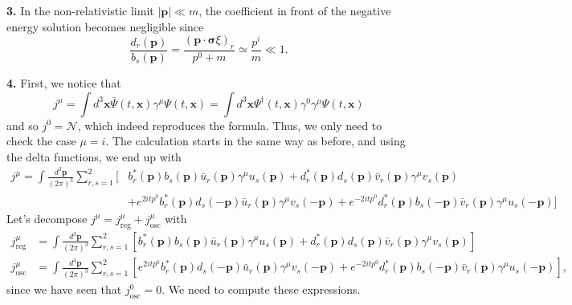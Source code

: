 \textbf{3.} In the non-relativistic limit $|\mathbf{p}| \ll m$, the coefficient in front of the negative energy solution becomes negligible since
\begin{equation}
    \frac{d_r(\mathbf{p})}{b_s(\mathbf{p})} = \frac{(\mathbf{p}\cdot\boldsymbol{\sigma}\xi)_r}{p^0+m} \simeq \frac{p^i}{m} \ll 1.
\end{equation}

\textbf{4.} First, we notice that
\begin{equation}
    j^\mu = \int d^3\mathbf{x} \bar{\Psi}(t, \mathbf{x})\gamma^\mu \Psi(t, \mathbf{x}) = \int d^3\mathbf{x} \Psi^\dagger(t, \mathbf{x})\gamma^0\gamma^\mu \Psi(t, \mathbf{x})
\end{equation}
and so $j^0 = \mathcal{N}$, which indeed reproduces the formula. Thus, we only need to check the case $\mu = i$. The calculation starts in the same way as before, and using the delta functions, we end up with
\begin{equation}
\begin{aligned}
    j^\mu = \int \frac{d^3\mathbf{p}}{(2\pi)^3} \sum_{r,s=1}^2 \bigg[ & b_r^*(\mathbf{p})b_s(\mathbf{p})\bar{u}_r(\mathbf{p})\gamma^\mu u_s(\mathbf{p}) + d_r^*(\mathbf{p})d_s(\mathbf{p})\bar{v}_r(\mathbf{p})\gamma^\mu v_s(\mathbf{p}) \\
    &+ e^{2itp^0} b_r^*(\mathbf{p})d_s(-\mathbf{p})\bar{u}_r(\mathbf{p})\gamma^\mu v_s(-\mathbf{p}) + e^{-2itp^0} d_r^*(\mathbf{p})b_s(-\mathbf{p})\bar{v}_r(\mathbf{p})\gamma^\mu u_s(-\mathbf{p}) \bigg]
\end{aligned}
\end{equation}
Let's decompose $j^\mu = j^\mu_{\text{reg}} + j^\mu_{\text{osc}}$ with
\begin{equation}
\begin{aligned}
    j^\mu_{\text{reg}} &= \int \frac{d^3\mathbf{p}}{(2\pi)^3} \sum_{r,s=1}^2 [b_r^*(\mathbf{p})b_s(\mathbf{p})\bar{u}_r(\mathbf{p})\gamma^\mu u_s(\mathbf{p}) + d_r^*(\mathbf{p})d_s(\mathbf{p})\bar{v}_r(\mathbf{p})\gamma^\mu v_s(\mathbf{p})] \\
    j^\mu_{\text{osc}} &= \int \frac{d^3\mathbf{p}}{(2\pi)^3} \sum_{r,s=1}^2 \left[ e^{2itp^0} b_r^*(\mathbf{p})d_s(-\mathbf{p})\bar{u}_r(\mathbf{p})\gamma^\mu v_s(-\mathbf{p}) + e^{-2itp^0} d_r^*(\mathbf{p})b_s(-\mathbf{p})\bar{v}_r(\mathbf{p})\gamma^\mu u_s(-\mathbf{p}) \right],
\end{aligned}
\end{equation}
since we have seen that $j^0_{\text{osc}} = 0$. We need to compute these expressions.
